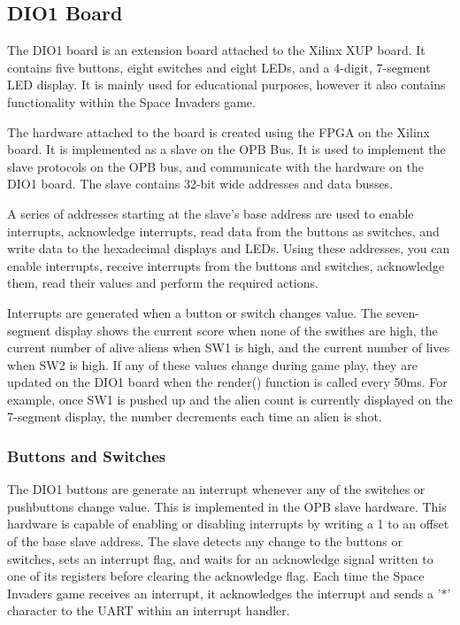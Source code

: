 \documentclass[11pt,letter,oneside]{report}
\begin{document}
\subsection{DIO1 Board}
The DIO1 board is an extension board attached to the Xilinx XUP board. It contains five buttons, eight switches and eight LEDs, and a 4-digit, 7-segment LED display. It is mainly used for educational purposes, however it also contains functionality within the Space Invaders game.

The hardware attached to the board is created using the FPGA on the Xilinx board. It is implemented as a slave on the OPB Bus. It is used to implement the slave protocols on the OPB bus, and communicate with the hardware on the DIO1 board.  The slave contains 32-bit wide addresses and data busses.

A series of addresses starting at the slave's base address are used to enable interrupts, acknowledge interrupts, read data from the buttons as switches, and write data to the hexadecimal displays and LEDs. Using these addresses, you can enable interrupts, receive interrupts from the buttons and switches, acknowledge them, read their values and perform the required actions. 

Interrupts are generated when a button or switch changes value. The seven-segment display shows the current score when none of the swithes are high, the current number of alive aliens when SW1 is high, and the current number of lives when SW2 is high. If any of these values change during game play, they are updated on the DIO1 board when the render() function is called every 50ms. For example, once SW1 is pushed up and the alien count is currently displayed on the 7-segment display, the number decrements each time an alien is shot.

\subsubsection{Buttons and Switches}
The DIO1 buttons are generate an interrupt whenever any of the switches or pushbuttons change value. This is implemented in the OPB slave hardware. This hardware is capable of enabling or disabling interrupts by writing a 1 to an offset of the base slave address. The slave detects any change to the buttons or switches, sets an interrupt flag, and waits for an acknowledge signal written to one of its registers before clearing the acknowledge flag. Each time the Space Invaders game receives an interrupt, it acknowledges the interrupt and sends a '*' character to the UART within an interrupt handler.
\end{document}
